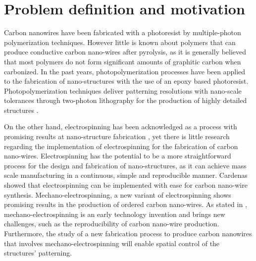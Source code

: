 \section{Problem definition and motivation}


Carbon nanowires have been fabricated with a photoresist by multiple-photon polymerization techniques. However little is known about polymers that can produce conductive carbon nano-wires after pyrolysis, as it is generally believed that most polymers do not form significant amounts of graphitic carbon when carbonized.
In the past years, photopolymerization processes have been applied to the fabrication of nano-structures with the use of an epoxy based photoresist. \cite{Boer2014} Photopolymerization techniques deliver patterning resolutions with nano-scale tolerances through two-photon lithography for the production of highly detailed structures \cite{Hribar2014}.

On the other hand, electrospinning has been acknowledged as a process with promising results at nano-structure fabrication \cite{Boer2014}, yet there is little research regarding the implementation of electrospinning for the fabrication of carbon nano-wires. Electrospinning has the potential to be a more straightforward process for the design and fabrication of nano-structures, as it can achieve mass scale manufacturing in a continuous, simple and reproducible manner. Cardenas \cite{Cardenas2017} showed that electrospinning can be implemented with ease for carbon nano-wire synthesis. Mechano-electrospinning, a new variant of electrospinning shows promising results in the production of ordered carbon nano-wires. As stated in \cite{Cardenas2017}, mechano-electrospinning is an early technology invention and brings new challenges, such as the reproducibility of carbon nano-wire production. Furthermore, the study of a new fabrication process to produce carbon nanowires that involves mechano-electrospinning will enable spatial control of the structures' patterning.

